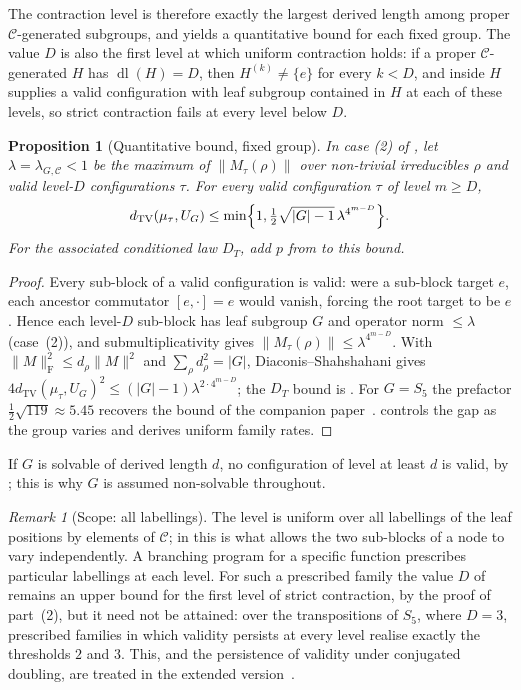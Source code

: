 \documentclass[11pt]{amsart}
\newtheorem{proposition}[proposition]{Proposition}
\theoremstyle{definition}
\theoremstyle{remark}
\newtheorem{remark}[remark]{Remark}
\theoremstyle{plain}
\theoremstyle{plain}
\numberwithin{equation}{section}
\newcommand{\norm}[1]{\lVert #1 \rVert}
\newcommand{\frob}[1]{\norm{#1}_{\mathrm{F}}}
\newcommand{\opn}[1]{\norm{#1}}
\newcommand{\dtv}{d_{\mathrm{TV}}}
\begin{document}
The contraction level is therefore exactly the largest derived length among proper
$\mathcal{C}$-generated subgroups, and yields a quantitative bound for each fixed group.
The value $D$ is also the first level at which uniform contraction holds: if a proper
$\mathcal C$-generated $H$ has $\operatorname{dl}(H)=D$, then $H^{(k)}\neq\{e\}$ for every
$k<D$, and  inside $H$ supplies a valid configuration with leaf subgroup
contained in $H$ at each of these levels, so strict contraction fails at every level below $D$.

\begin{proposition}[Quantitative bound, fixed group]
\label{prop:quant}
In case (2) of , let $\lambda=\lambda_{G,\mathcal C}<1$
be the maximum of $\opn{M_\tau(\rho)}$ over non-trivial irreducibles
$\rho$ and valid level-$D$ configurations $\tau$.
For every valid configuration $\tau$ of level $m\ge D$,
\[
 \dtv(\mu_\tau,U_G)\le
 \min\Bigl\{1,\tfrac12\sqrt{|G|-1}\,\lambda^{4^{m-D}}\Bigr\}.
\]
For the associated conditioned law $D_T$, add $p$ from
 to this bound.
\end{proposition}
\begin{proof}
Every sub-block of a valid configuration is valid: were a sub-block target $e$, each
ancestor commutator $[e,\cdot]=e$ would vanish, forcing the root target to be $e$. Hence
each level-$D$ sub-block has leaf subgroup $G$ and operator norm $\le\lambda$
(case~(2)), and submultiplicativity gives
$\opn{M_\tau(\rho)}\le\lambda^{4^{m-D}}$.
With $\frob{M}^2\le d_\rho\opn{M}^2$ and $\sum_\rho d_\rho^2=|G|$, Diaconis--Shahshahani
gives $4\dtv(\mu_\tau,U_G)^2\le(|G|-1)\lambda^{2\cdot4^{m-D}}$; the $D_T$ bound is
. For $G=S_5$ the prefactor $\tfrac12\sqrt{119}\approx5.45$
recovers the bound of the companion paper~\cite{ZermenoS5}. 
controls the gap as the group varies and derives uniform family rates.
\end{proof}

If $G$ is solvable of derived length $d$, no configuration of level at
least $d$ is valid, by ; this is why $G$ is assumed
non-solvable throughout.

\begin{remark}[Scope: all labellings]
\label{rem:configurable}
The level is uniform over all labellings of the leaf positions by
elements of $\mathcal C$; in  this is what allows the
two sub-blocks of a node to vary independently. A branching program for
a specific function prescribes particular labellings at each level. For
such a prescribed family the value $D$ of  remains
an upper bound for the first level of strict contraction, by the proof
of part~(2), but it need not be attained: over the transpositions of
$S_5$, where $D=3$, prescribed families in which validity persists at
every level realise exactly the thresholds $2$ and $3$. This, and the
persistence of validity under conjugated doubling, are treated in the
extended version~\cite[Section~5.1]{ZermenoExtended}.
\end{remark}
\end{document}
